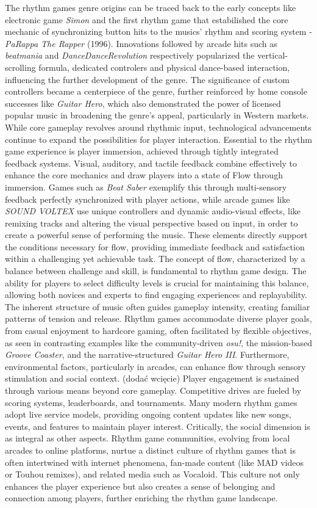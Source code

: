 The rhythm games genre origins can be traced back to the early concepts like electronic game \textit{Simon} and the first rhythm game that estabilished the core mechanic of synchronizing button hits to the musics' rhythm and scoring system - \textit{PaRappa The Rapper} (1996). Innovations followed by arcade hits such as \textit{beatmania} and \textit{DanceDanceRevolution} respectively popularized the vertical-scrolling formula, dedicated controlers and physical dance-based interaction, influencing the further development of the genre. The significance of custom controllers became a centerpiece of the genre, further reinforced by home console successes like \textit{Guitar Hero}, which also demonstrated the power of licensed popular music in broadening the genre's appeal, particularly in Western markets. While core gameplay revolves around rhythmic input, technological advancements continue to expand the possibilities for player interaction.
Essential to the rhythm game experience is player immersion, achieved through tightly integrated feedback systems. Visual, auditory, and tactile feedback combine effectively to enhance the core mechanics and draw players into a state of Flow through immersion. Games such as \textit{Beat Saber} exemplify this through multi-sensory feedback perfectly synchronized with player actions, while arcade games like \textit{SOUND VOLTEX} use unique controllers and dynamic audio-visual effects, like remixing tracks and altering the visual perspective based on input, in order to create a powerful sense of performing the music. These elements directly support the conditions necessary for flow, providing immediate feedback and satisfaction within a challenging yet achievable task.
The concept of flow, characterized by a balance between challenge and skill, is fundamental to rhythm game design. The ability for players to select difficulty levels is crucial for maintaining this balance, allowing both novices and experts to find engaging experiences and replayability. The inherent structure of music often guides gameplay intensity, creating familiar patterns of tension and release. Rhythm games accommodate diverse player goals, from casual enjoyment to hardcore gaming, often facilitated by flexible objectives, as seen in contrasting examples like the community-driven \textit{osu!}, the mission-based \textit{Groove Coaster}, and the narrative-structured \textit{Guitar Hero III}. Furthermore, environmental factors, particularly in arcades, can enhance flow through sensory stimulation and social context.
(dodać wcięcie) Player engagement is sustained through various means beyond core gameplay. Competitive drives are fueled by scoring systems, leaderboards, and tournaments. Many modern rhythm games adopt live service models, providing ongoing content updates like new songs, events, and features to maintain player interest. Critically, the social dimension is as integral as other aspects. Rhythm game communities, evolving from local arcades to online platforms, nurtue a distinct culture of rhythm games that is often intertwined with internet phenomena, fan-made content (like MAD videos or Touhou remixes), and related media such as Vocaloid. This culture not only enhances the player experience but also creates a sense of belonging and connection among players, further enriching the rhythm game landscape.
